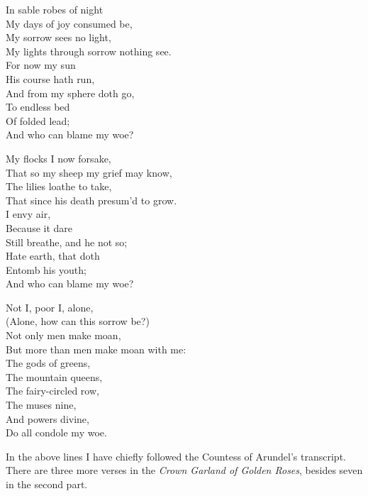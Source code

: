 \settowidth{\versewidth}{\vin But more than men make moan with me:}
\begin{dcverse}\begin{patverse}
In sable robes of night\\
My days of joy consumed be,\\
My sorrow sees no light,\\
My lights through sorrow nothing see.\\
For now my sun\\
His course hath run,\\
And from my sphere doth go,\\
To endless bed\\
Of folded lead;\\
And who can blame my woe?
\end{patverse}

\begin{patverse}
My flocks I now forsake,\\
That so my sheep my grief may know,\\
The lilies loathe to take,\\
That since his death presum’d to grow.\\
I envy air,\\
Because it dare\\
Still breathe, and he not so;\\
Hate earth, that doth\\
Entomb his youth;\\
And who can blame my woe?
\end{patverse}

\begin{patverse}
Not I, poor I, alone,\\
(Alone, how can this sorrow be?)\\
Not only men make moan,\\
But more than men make moan with me:\\
The gods of greens, \\
The mountain queens,\\
The fairy-circled row,\\
The muses nine,\\
And powers divine,\\
Do all condole my woe.
\end{patverse}
\end{dcverse}

In the above lines I have chiefly followed the Countess of Arundel’s transcript.
There are three more verses in the \textit{Crown Garland of Golden Roses}, besides seven
in the second part.
\pagebreak

